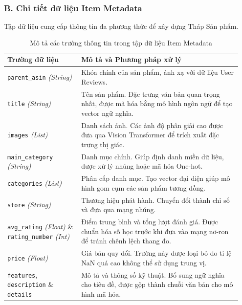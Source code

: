 \subsubsection*{B. Chi tiết dữ liệu Item Metadata}
Tập dữ liệu cung cấp thông tin đa phương thức để xây dựng Tháp Sản phẩm.

\begin{table}[H]
    \centering
    \caption{Mô tả các trường thông tin trong tập dữ liệu Item Metadata}
    \label{tab:item_metadata_desc}
    \renewcommand{\arraystretch}{1.3}
    \begin{tabular}{|p{0.3\linewidth}|p{0.65\linewidth}|}
        \hline
        \textbf{Trường dữ liệu} & \textbf{Mô tả và Phương pháp xử lý} \\
        \hline
        \texttt{parent\_asin} \newline \textit{(String)} & 
        Khóa chính của sản phẩm, ánh xạ với dữ liệu User Reviews. \\
        \hline
        \texttt{title} \newline \textit{(String)} & 
        Tên sản phẩm. Đặc trưng văn bản quan trọng nhất, được mã hóa bằng mô hình ngôn ngữ để tạo vector ngữ nghĩa. \\
        \hline
        \texttt{images} \newline \textit{(List)} & 
        Danh sách ảnh. Các ảnh độ phân giải cao được đưa qua Vision Transformer để trích xuất đặc trưng thị giác. \\
        \hline
        \texttt{main\_category} \newline \textit{(String)} & 
        Danh mục chính. Giúp định danh miền dữ liệu, được xử lý nhúng hoặc mã hóa One-hot. \\
        \hline
        \texttt{categories} \newline \textit{(List)} & 
        Phân cấp danh mục. Tạo vector đại diện giúp mô hình gom cụm các sản phẩm tương đồng. \\
        \hline
        \texttt{store} \newline \textit{(String)} & 
        Thương hiệu phát hành. Chuyển đổi thành chỉ số và đưa qua mạng nhúng. \\
        \hline
        \texttt{avg\_rating} \textit{(Float)} \& \newline \texttt{rating\_number} \textit{(Int)} & 
        Điểm trung bình và tổng lượt đánh giá. Được chuẩn hóa số học trước khi đưa vào mạng nơ-ron để tránh chênh lệch thang đo. \\
        \hline
        \texttt{price} \newline \textit{(Float)} & 
        Giá bán quy đổi. Trường này được loại bỏ do tỉ lệ NaN quá cao không thể sử dụng trung vị. \\
        \hline
        \texttt{features}, \texttt{description} \newline \& \texttt{details} & 
        Mô tả và thông số kỹ thuật. Bổ sung ngữ nghĩa cho tiêu đề, được gộp thành chuỗi văn bản cho mô hình mã hóa. \\
        \hline
    \end{tabular}
\end{table}

